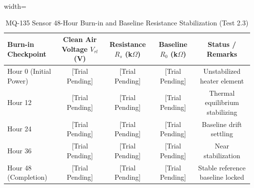 \begin{table}[htbp!]
\centering
\caption{MQ-135 Sensor 48-Hour Burn-in and Baseline Resistance Stabilization (Test 2.3)}
\label{tab:mq135_burnin}
\begin{adjustbox}{width=\textwidth}
\begin{tabular}{lcccc}
\toprule
\textbf{Burn-in Checkpoint} & \textbf{Clean Air Voltage $V_{rl}$ (V)} & \textbf{Resistance $R_s$ (k$\Omega$)} & \textbf{Baseline $R_0$ (k$\Omega$)} & \textbf{Status / Remarks} \\
\midrule
Hour 0 (Initial Power) & [Trial Pending] & [Trial Pending] & [Trial Pending] & Unstabilized heater element \\
Hour 12 & [Trial Pending] & [Trial Pending] & [Trial Pending] & Thermal equilibrium stabilizing \\
Hour 24 & [Trial Pending] & [Trial Pending] & [Trial Pending] & Baseline drift settling \\
Hour 36 & [Trial Pending] & [Trial Pending] & [Trial Pending] & Near stabilization \\
Hour 48 (Completion) & [Trial Pending] & [Trial Pending] & [Trial Pending] & Stable reference baseline locked \\
\bottomrule
\end{tabular}
\end{adjustbox}
\end{table}

